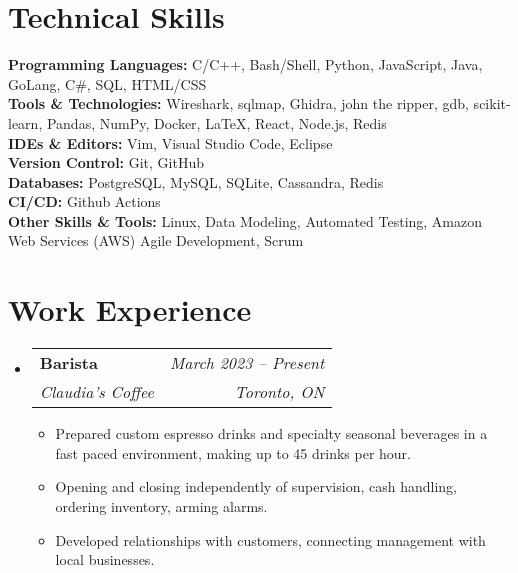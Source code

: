 \documentclass[letterpaper,11pt]{article}
\makeatletter
\newcommand{\resumeItem}[1]{
  \item\small{
    {#1 \vspace{-2pt}}
  }
}
\newcommand{\resumeSubheading}[4]{
  \vspace{-2pt}\item
    \begin{tabular*}{0.97\textwidth}[t]{l@{\extracolsep{\fill}}r}
      \textbf{#1} & #2 \\
      \textit{\small#3} & \textit{\small #4} \\
    \end{tabular*}\vspace{-7pt}
}
\newcommand{\resumeSubHeadingListStart}{\begin{itemize}[leftmargin=0.15in, label={}]}
\newcommand{\resumeSubHeadingListEnd}{\end{itemize}}
\newcommand{\resumeItemListStart}{\begin{itemize}}
\newcommand{\resumeItemListEnd}{\end{itemize}\vspace{-5pt}}
\makeatother
\begin{document}
%
\section{Technical Skills}
 \begin{itemize}[leftmargin=0.15in, label={}]
    \small{\item{
	\textbf{Programming Languages:} C/C++, Bash/Shell, Python, JavaScript, Java, GoLang, C\#, SQL, HTML/CSS\\
	\textbf{Tools \& Technologies:} Wireshark, sqlmap, Ghidra, john the ripper, gdb, scikit-learn, Pandas, NumPy, Docker, LaTeX, React, Node.js, Redis \\
	\textbf{IDEs \& Editors:} Vim, Visual Studio Code, Eclipse \\
	\textbf{Version Control:} Git, GitHub \\
	\textbf{Databases:} PostgreSQL, MySQL, SQLite, Cassandra, Redis\\
	\textbf{CI/CD:} Github Actions \\
	\textbf{Other Skills \& Tools:} Linux, Data Modeling, Automated Testing, Amazon Web Services (AWS) Agile Development, Scrum
    }}
 \end{itemize}


\section{Work Experience}
  \resumeSubHeadingListStart

    \resumeSubheading
    {Barista}{\emph{March 2023 -- Present}}
      {Claudia's Coffee}{Toronto, ON}
      \resumeItemListStart
        \resumeItem{Prepared custom espresso drinks and specialty seasonal beverages in a fast paced environment, making up to 45 drinks per hour.}
	\resumeItem{Opening and closing independently of supervision, cash handling, ordering inventory, arming alarms.}
	\resumeItem{Developed relationships with customers, connecting management with local businesses.}
      \resumeItemListEnd

  \resumeSubHeadingListEnd


\end{document}
